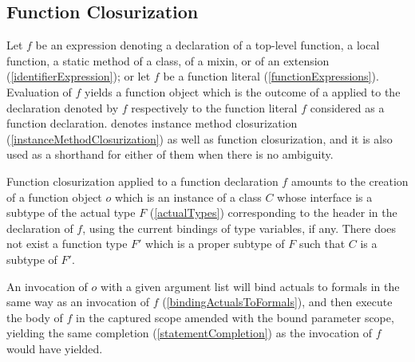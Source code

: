 \documentclass[makeidx]{article}
\begin{document}
{\subsection{Function Closurization}

\LMHash{}%
Let $f$ be an expression denoting
a declaration of a top-level function, a local function,
a static method of a class, of a mixin, or of an extension
(\ref{identifierExpression});
or let $f$ be a function literal
(\ref{functionExpressions}).
Evaluation of $f$ yields a function object
which is the outcome of a 
applied to the declaration denoted by $f$
respectively to the function literal $f$ considered as a function declaration.
denotes instance method closurization
(\ref{instanceMethodClosurization})
as well as function closurization,
and it is also used as a shorthand for either of them
when there is no ambiguity.

\LMHash{}%
Function closurization applied to a function declaration $f$
amounts to the creation of a function object $o$
which is an instance of a class $C$ whose interface is
a subtype of the actual type $F$
(\ref{actualTypes})
corresponding to the header in the declaration of $f$,
using the current bindings of type variables, if any.
There does not exist a function type $F'$ which is a proper subtype of $F$
such that $C$ is a subtype of $F'$.



\LMHash{}%
An invocation of $o$ with a given argument list will bind actuals to formals
in the same way as an invocation of $f$
(\ref{bindingActualsToFormals}),
and then execute the body of $f$
in the captured scope amended with the bound parameter scope,
yielding the same completion
(\ref{statementCompletion})
as the invocation of $f$ would have yielded.

}
\end{document}
